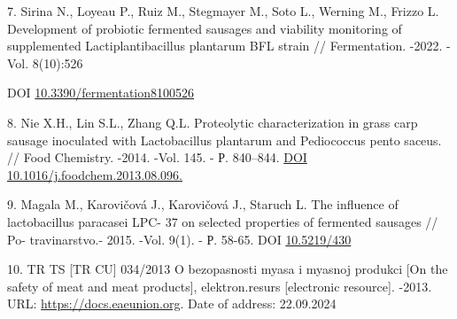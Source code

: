 \begin{references}
7. Sirina N., Loyeau P., Ruiz M., Stegmayer M., Soto L., Werning M.,
Frizzo L. Development of probiotic fermented sausages and viability
monitoring of supplemented Lactiplantibacillus plantarum BFL strain //
Fermentation. -2022. -Vol. 8(10):526

DOI
\href{https://doi.org/10.3390/fermentation8100526}{10.3390/fermentation8100526}

8. Nie X.H., Lin S.L., Zhang Q.L. Proteolytic characterization in grass
carp sausage inoculated with Lactobacillus plantarum and Pediococcus
pento saceus. // Food Chemistry. -2014. -Vol. 145. - Р. 840--844.
\href{https://doi.org/10.1016/j.foodchem.2013.08.096}{DOI
10.1016/j.foodchem.2013.08.096.}

9. Magala M., Karovičová J., Karovičová J., Staruch L. The influence of
lactobacillus paracasei LPC- 37 on selected properties of fermented
sausages // Po- travinarstvo.- 2015. -Vol. 9(1). - Р. 58-65. DOI
\href{https://doi.org/10.5219/430}{10.5219/430}

10. TR TS {[}TR CU{]} 034/2013 O bezopasnosti myasa i myasnoj produkci
{[}On the safety of meat and meat products{]}, elektron.resurs
{[}electronic resource{]}. -2013. URL:
\href{https://docs.eaeunion.org/docs/ru-ru/0043629/cncd\_11102013\_68}{https://docs.eaeunion.org}. Date of address: 22.09.2024
\end{references}

